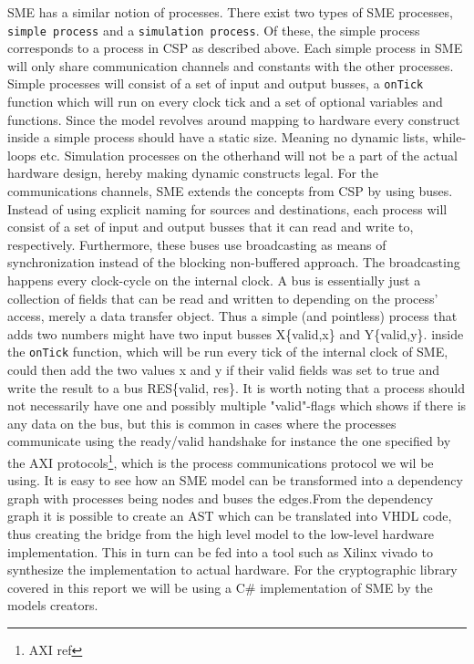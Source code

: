\documentclass[a4paper]{article}
\begin{document}
SME has a similar notion of processes. There exist two types of SME processes, \texttt{simple process} and a \texttt{simulation process}. Of these, the simple process corresponds to a process in CSP as described above. Each simple process in SME will only share communication channels and constants with the other processes. Simple processes will consist of a set of input and output busses, a \texttt{onTick} function which will run on every clock tick and a set of optional variables and functions. Since the model revolves around mapping to hardware every construct inside a simple process should have a static size. Meaning no dynamic lists, while-loops etc. Simulation processes on the otherhand will not be a part of the actual hardware design, hereby making dynamic constructs legal.
For the communications channels, SME extends the concepts from CSP by using buses. Instead of using explicit naming for sources and destinations, each process will consist of a set of input and output busses that it can read and write to, respectively. Furthermore, these buses use broadcasting as means of synchronization instead of the blocking non-buffered approach.  The broadcasting happens every clock-cycle on the internal clock.
A bus is essentially just a collection of fields that can be read and written to depending on the process' access, merely a data transfer object. Thus a simple (and pointless) process that adds two numbers might have two input busses X\{valid,x\} and Y\{valid,y\}. inside the \texttt{onTick} function, which will be run every tick of the internal clock of SME, could then add the two values x and y if their valid fields was set to true and write the result to a bus RES\{valid, res\}. It is worth noting that a process should not necessarily have one and possibly multiple "valid"-flags which shows if there is any data on the bus, but this is common in cases where the processes communicate using the ready/valid handshake for instance the one specified by the AXI protocols\footnote{AXI ref}, which is the process communications protocol we wil be using. It is easy to see how an SME model can be transformed into a dependency graph with processes being nodes and buses the edges.From the dependency graph it is possible to create an AST which can be translated into VHDL code\cite{SME}, thus creating the bridge from the high level model to the low-level hardware implementation. This in turn can be fed into a tool such as Xilinx vivado to synthesize the implementation to actual hardware. For the cryptographic library covered in this report we will be using a C\# implementation of SME by the models creators\cite{SME}.
\end{document}
